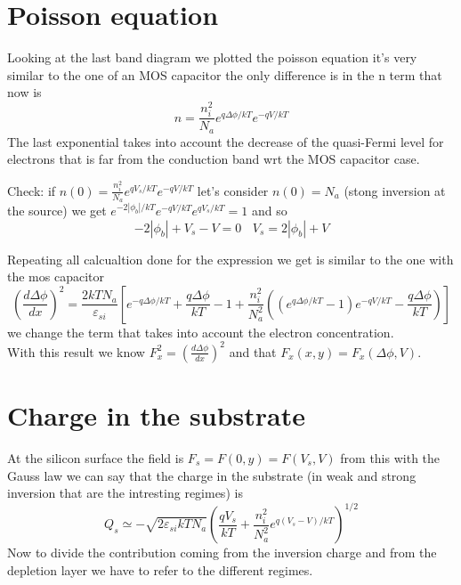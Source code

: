 \section{Poisson equation}
Looking at the last band diagram we plotted the poisson equation it's very similar to the one of an MOS capacitor the only difference is in the n term that now is 
\begin{equation}
n=\frac{n_i^2}{N_a}e^{q\Delta \phi /kT}e^{-qV/kT}
\end{equation}
The last exponential takes into account the decrease of the quasi-Fermi level for electrons that is far from the conduction band wrt the MOS capacitor case.\\

\vspace{5mm}

Check: if $n(0)=\frac{n_i^2}{N_a}e^{qV_s/kT}e^{-qV/kT}$ let's consider $n(0)=N_a$ (stong inversion at the source) we get $e^{-2|\phi_b|/kT}e^{-qV/kT}e^{qV_s/kT}=1$ and so
\begin{equation}
-2|\phi_b|+V_s-V=0 \ \ \ \ V_s=2|\phi_b|+V
\end{equation}

\vspace{5mm}

Repeating all calcualtion done for the expression we get is similar to the one with the mos capacitor
\begin{equation}
\left(\frac{d\Delta\phi}{dx}\right)^2=\frac{2kTN_a}{\varepsilon_{si}}[e^{-q\Delta\phi/kT}+\frac{q\Delta\phi}{kT}-1+\frac{n_i^2}{N_a^2}\left((e^{q\Delta\phi/kT}-1)e^{-qV/kT}-\frac{q\Delta\phi}{kT}\right)]
\end{equation}
we change the term that takes into account the electron concentration.\\
With this result we know $F_x^2=\left(\frac{d\Delta\phi}{dx}\right)^2$ and that $F_x(x,y)=F_x(\Delta\phi,V)$.\\

\section{Charge in the substrate}
At the silicon surface the field is $F_s=F(0,y)=F(V_s,V)$ from this with the Gauss law we can say that the charge in the substrate (in weak and strong inversion that are the intresting regimes) is 
\begin{equation}
Q_s\simeq-\sqrt{2\varepsilon_{si}kTN_a}\left(\frac{qV_s}{kT}+\frac{n_i^2}{N_a^2}e^{q(V_s-V)/kT}\right)^{1/2}
\end{equation}
Now to divide the contribution coming from the inversion charge and from the depletion layer we have to refer to the different regimes.\\

